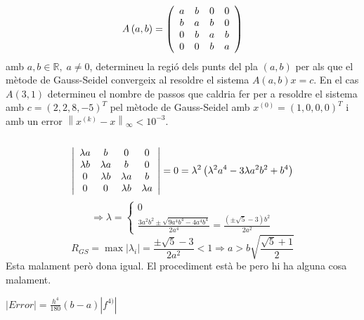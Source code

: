 \documentclass[../main.tex]{subfiles}
\begin{document}
    \begin{exercici}[30]
        \begin{displaymath}
            A\left(a,b\right) = \left(
                \begin{array}{c c c c}
                    a & b & 0 & 0\\
                    b & a & b & 0\\
                    0 & b & a & b\\
                    0 & 0 & b & a
                \end{array}
            \right)
        \end{displaymath}
        amb $a, b \in \mathbb{R},\; a \neq 0$, determineu la regió dels punts del pla $(a,b)$ per
        als que el mètode de Gauss-Seidel convergeix al resoldre el sistema $A\left(a,b\right)x = c$.
        En el cas $A\left(3, 1\right)$ determineu el nombre de passos que caldria fer per a resoldre
        el sistema amb $c = \left(2,2,8,-5\right)^T$ pel mètode de Gauss-Seidel amb $x^{(0)} = \left(1,0,0,0\right)^T$
        i amb un error $\left\lVert x^{(k)}-x\right\rVert _\infty < 10^{-3}$.\\\\
        \begin{displaymath}
            \left\lvert
                \begin{array}{c c c c}
                    \lambda a & b & 0 & 0\\
                    \lambda b & \lambda a & b & 0\\
                    0 & \lambda b & \lambda a & b\\
                    0 & 0 & \lambda b & \lambda a
                \end{array}
            \right\rvert = 0 = \lambda^2\left(\lambda^2 a^4 - 3\lambda a^2 b^2 + b^4\right)
        \end{displaymath}
        \begin{displaymath}
            \Rightarrow \lambda = \begin{cases}
                0\\
                \frac{3a^2 b^2 \pm \sqrt{9a^4 b^4 - 4a^4b^4}}{2a^4} = \frac{(\pm \sqrt{5}-3)b^2}{2a^2}
            \end{cases}
        \end{displaymath}
        \begin{displaymath}
            R_{GS} = \max{\left\lvert\lambda_i\right\rvert} = \frac{\pm \sqrt{5} - 3}{2a^2} < 1\Rightarrow a > b \sqrt{\frac{\sqrt{5}+1}{2}}
        \end{displaymath}
        Esta malament però dona igual. El procediment està be pero hi ha alguna cosa malament.
    \end{exercici}
    \begin{exercici}[Problema 40]
        $\left\lvert Error\right\rvert = \frac{h^4}{180}(b-a)\left\lvert f^{4)}\right\rvert$
    \end{exercici}
\end{document}
